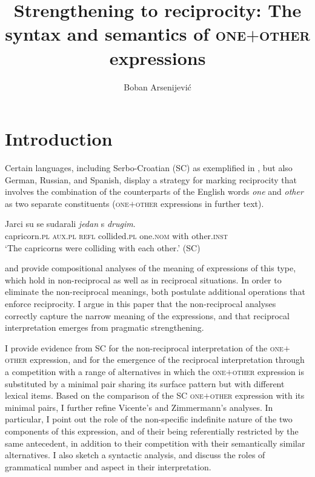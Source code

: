 \documentclass[output=paper,colorlinks,citecolor=brown]{langscibook}
\author{Boban Arsenijević\affiliation{University of Graz}\orcid{0000-0002-1124-6319}}
\title[Strengthening to reciprocity]{Strengthening to reciprocity: The syntax and semantics of \textsc{one$+$other} expressions}
\begin{document}
\maketitle

%

\section{Introduction}\label{sec:arsenijevic:intro}

Certain languages, including Serbo-Croatian (SC) as exemplified in , but also German, Russian, and Spanish, display a strategy for marking reciprocity that involves the combination of the counterparts of the English words \textit{one} and \textit{other} as two separate constituents (\textsc{one$+$other} expressions in further text).

\ea\label{ex:arsenijevic:Jarci}
\gll Jarci su se sudarali \textit{jedan} s \textit{drugim}. \\
capricorn.\textsc{pl} \textsc{aux.pl} \textsc{refl} collided.\textsc{pl} 
one.\textsc{nom} with other.\textsc{inst}\\
\glt`The capricorns were colliding with each other.' \hfill (SC) 
\z

\noindent \citet{v10} and \citet{z14} provide compositional analyses of the meaning of expressions of this type, which hold in non-reciprocal as well as in reciprocal situations. In order to eliminate the non-reciprocal meanings, both postulate additional operations that enforce reciprocity. I argue in this paper that the non-reciprocal analyses correctly capture the narrow meaning of the expressions, and that reciprocal interpretation emerges from pragmatic strengthening.

I provide evidence from SC for the non-reciprocal interpretation of the \textsc{one$+$other} expression, and for the emergence of the reciprocal interpretation through a competition with a range of alternatives in which the \textsc{one$+$other} expression is substituted by a minimal pair sharing its surface pattern but with different lexical items. Based on the comparison of the SC \textsc{one$+$other} expression with its minimal pairs, I further refine Vicente's and Zimmermann's analyses. In particular, I point out the role of the non-specific indefinite nature of the two components of this expression, and of their being referentially restricted by the same antecedent, in addition to their competition with their semantically similar alternatives. I also sketch a syntactic analysis, and discuss the roles of grammatical number and aspect in their interpretation.
\end{document}
